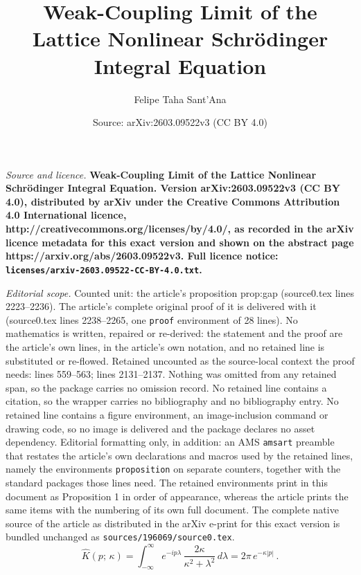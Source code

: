 \documentclass[10pt,a4paper]{amsart}
\title{\LARGE\bfseries Weak-Coupling Limit of the Lattice Nonlinear Schr\"odinger Integral Equation}
\author{Felipe Taha Sant'Ana}
\date{Source: arXiv:2603.09522v3 (CC BY 4.0)}
\begin{document}
\maketitle

\noindent\emph{Source and licence.} \LARGE\bfseries Weak-Coupling Limit of the Lattice Nonlinear Schr\"odinger Integral Equation. Version arXiv:2603.09522v3 (CC BY 4.0), distributed by arXiv under the Creative Commons Attribution 4.0 International licence, http://creativecommons.org/licenses/by/4.0/, as recorded in the arXiv licence metadata for this exact version and shown on the abstract page https://arxiv.org/abs/2603.09522v3. Full licence notice: \texttt{licenses/arxiv-2603.09522-CC-BY-4.0.txt}.\par\smallskip

\noindent\textit{Editorial scope.} Counted unit: the article's proposition prop:gap (source0.tex lines 2223--2236). The article's complete original proof of it is delivered with it (source0.tex lines 2238--2265, one \texttt{proof} environment of 28 lines). No mathematics is written, repaired or re-derived: the statement and the proof are the article's own lines, in the article's own notation, and no retained line is substituted or re-flowed.  Retained uncounted as the source-local context the proof needs: lines 559--563; lines 2131--2137.  Nothing was omitted from any retained span, so the package carries no omission record.  No retained line contains a citation, so the wrapper carries no bibliography and no bibliography entry.  No retained line contains a figure environment, an image-inclusion command or drawing code, so no image is delivered and the package declares no asset dependency.  Editorial formatting only, in addition: an AMS \texttt{amsart} preamble that restates the article's own declarations and macros used by the retained lines, namely the environments \texttt{proposition} on separate counters, together with the standard packages those lines need.  The retained environments print in this document as Proposition 1 in order of appearance, whereas the article prints the same items with the numbering of its own full document.  The complete native source of the article as distributed in the arXiv e-print for this exact version is bundled unchanged as \texttt{sources/196069/source0.tex}.
\begin{equation}\label{eq.K-fourier}
  \hat K(p;\,\kappa) = \int_{-\infty}^{\infty}e^{-ip\lambda}\,
  \frac{2\kappa}{\kappa^2 + \lambda^2}\,d\lambda
  = 2\pi\,e^{-\kappa|p|}\,.
\end{equation}
\end{document}
